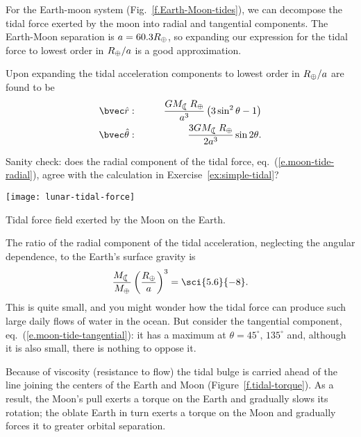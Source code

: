 For the Earth-moon system (Fig.~\ref{f.Earth-Moon-tides}), we can decompose the tidal force exerted by the moon into radial and tangential components.  The Earth-Moon separation is $a = 60.3 R_{\oplus}$, so expanding our expression for the tidal force to lowest order in $R_{\oplus}/a$ is a good approximation.

Upon expanding the tidal acceleration components to lowest order in $R_{\oplus}/a$ are found to be
\begin{eqnarray}
\label{e.moon-tide-radial}\rhat: &\qquad& \frac{GM_{\Moon}R_{\Earth}}{a^{3}}\left(3\sin^{2}\theta - 1\right)\\
\label{e.moon-tide-tangential}\thetahat: &\qquad& \frac{3GM_{\Moon}R_{\Earth}}{2a^{3}}\sin2\theta.
\end{eqnarray}
\begin{exercisebox}
Sanity check: does the radial component of the tidal force, eq.~(\ref{e.moon-tide-radial}), agree with the calculation in Exercise~\ref{ex:simple-tidal}?
\end{exercisebox}
\begin{marginfigure}
\texttt{[image: lunar-tidal-force]}
\caption[Components of the tidal force]{Tidal force field exerted by the Moon on the Earth.
\label{f.lunar-tidal-force}}
\end{marginfigure}
\noindent The ratio of the radial component of the tidal acceleration, neglecting the angular dependence, to the Earth's surface gravity is
\[ \frac{M_{\Moon}}{M_{\Earth}}\left(\frac{R_{\Earth}}{a}\right)^{3} = \sci{5.6}{-8}. \]
This is quite small, and you might wonder how the tidal force can produce such large daily flows of water in the ocean.  But consider the tangential component, eq.~(\ref{e.moon-tide-tangential}): it has a maximum at $\theta = 45^{\circ},\,135^{\circ}$ and, although it is also small, there is nothing to oppose it.

 Because of viscosity (resistance to flow) the tidal bulge is carried ahead of the line joining the centers of the Earth and Moon (Figure~\ref{f.tidal-torque}).  As a result, the Moon's pull exerts a torque on the Earth and gradually slows its rotation; the oblate Earth in turn exerts a torque on the Moon and gradually forces it to greater orbital separation.

